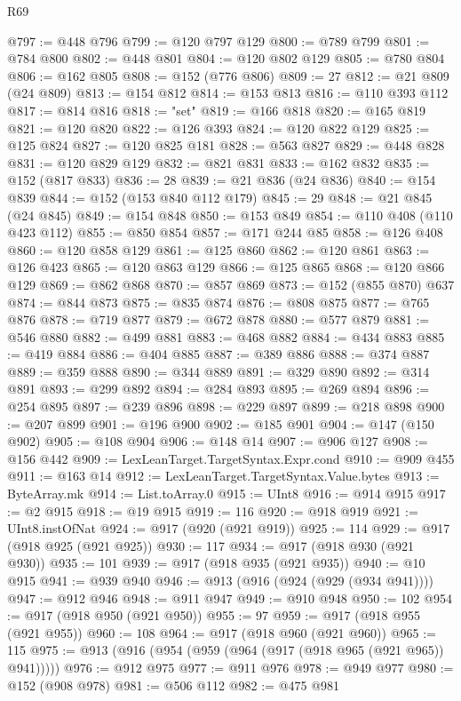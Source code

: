 \begin{lexlean}{R69}
\begin{coremodule}
@797 := @448 @796
@799 := @120 @797 @129
@800 := @789 @799
@801 := @784 @800
@802 := @448 @801
@804 := @120 @802 @129
@805 := @780 @804
@806 := @162 @805
@808 := @152 (@776 @806)
@809 := 27
@812 := @21 @809 (@24 @809)
@813 := @154 @812
@814 := @153 @813
@816 := @110 @393 @112
@817 := @814 @816
@818 := "set"
@819 := @166 @818
@820 := @165 @819
@821 := @120 @820
@822 := @126 @393
@824 := @120 @822 @129
@825 := @125 @824
@827 := @120 @825 @181
@828 := @563 @827
@829 := @448 @828
@831 := @120 @829 @129
@832 := @821 @831
@833 := @162 @832
@835 := @152 (@817 @833)
@836 := 28
@839 := @21 @836 (@24 @836)
@840 := @154 @839
@844 := @152 (@153 @840 @112 @179)
@845 := 29
@848 := @21 @845 (@24 @845)
@849 := @154 @848
@850 := @153 @849
@854 := @110 @408 (@110 @423 @112)
@855 := @850 @854
@857 := @171 @244 @85
@858 := @126 @408
@860 := @120 @858 @129
@861 := @125 @860
@862 := @120 @861
@863 := @126 @423
@865 := @120 @863 @129
@866 := @125 @865
@868 := @120 @866 @129
@869 := @862 @868
@870 := @857 @869
@873 := @152 (@855 @870) @637
@874 := @844 @873
@875 := @835 @874
@876 := @808 @875
@877 := @765 @876
@878 := @719 @877
@879 := @672 @878
@880 := @577 @879
@881 := @546 @880
@882 := @499 @881
@883 := @468 @882
@884 := @434 @883
@885 := @419 @884
@886 := @404 @885
@887 := @389 @886
@888 := @374 @887
@889 := @359 @888
@890 := @344 @889
@891 := @329 @890
@892 := @314 @891
@893 := @299 @892
@894 := @284 @893
@895 := @269 @894
@896 := @254 @895
@897 := @239 @896
@898 := @229 @897
@899 := @218 @898
@900 := @207 @899
@901 := @196 @900
@902 := @185 @901
@904 := @147 (@150 @902)
@905 := @108 @904
@906 := @148 @14
@907 := @906 @127
@908 := @156 @442
@909 := LexLeanTarget.TargetSyntax.Expr.cond
@910 := @909 @455
@911 := @163 @14
@912 := LexLeanTarget.TargetSyntax.Value.bytes
@913 := ByteArray.mk
@914 := List.toArray.{0}
@915 := UInt8
@916 := @914 @915
@917 := @2 @915
@918 := @19 @915
@919 := 116
@920 := @918 @919
@921 := UInt8.instOfNat
@924 := @917 (@920 (@921 @919))
@925 := 114
@929 := @917 (@918 @925 (@921 @925))
@930 := 117
@934 := @917 (@918 @930 (@921 @930))
@935 := 101
@939 := @917 (@918 @935 (@921 @935))
@940 := @10 @915
@941 := @939 @940
@946 := @913 (@916 (@924 (@929 (@934 @941))))
@947 := @912 @946
@948 := @911 @947
@949 := @910 @948
@950 := 102
@954 := @917 (@918 @950 (@921 @950))
@955 := 97
@959 := @917 (@918 @955 (@921 @955))
@960 := 108
@964 := @917 (@918 @960 (@921 @960))
@965 := 115
@975 := @913 (@916 (@954 (@959 (@964 (@917 (@918 @965 (@921 @965)) @941)))))
@976 := @912 @975
@977 := @911 @976
@978 := @949 @977
@980 := @152 (@908 @978)
@981 := @506 @112
@982 := @475 @981

\end{coremodule}
\end{lexlean}
